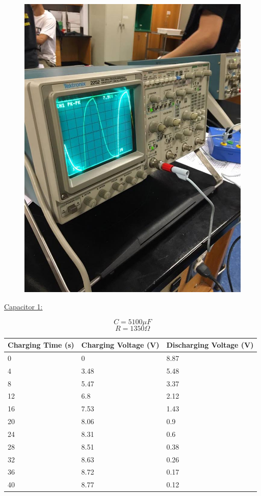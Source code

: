 \documentclass[11pt, titlepage]{article}
\begin{document}
\begin{figure}[h]
\centering
\hspace*{0cm}
\includegraphics[scale=0.6]{lab52.jpg}
\vspace*{0cm}
\end{figure}

\underline{Capacitor 1:}
\begin{center}
$$C = 5100 \mu F$$
$$R = 1350 \Omega$$
\begin{tabular}
{|m{9em}|m{9em}|m{9em}|}
\hline
Charging Time (s) & Charging Voltage (V) & Discharging Voltage (V) \\
\hline
0 & 0 & 8.87\\
\hline
4 & 3.48 & 5.48\\
\hline
8 & 5.47 & 3.37\\
\hline
12 & 6.8 & 2.12\\
\hline
16 & 7.53 & 1.43\\
\hline
20 & 8.06 & 0.9\\
\hline
24 & 8.31 & 0.6\\
\hline
28 & 8.51 & 0.38\\
\hline
32 & 8.63 & 0.26\\
\hline
36 & 8.72 & 0.17\\
\hline
40 & 8.77 & 0.12\\
\hline
\end{tabular}
\end{center}
\end{document}
